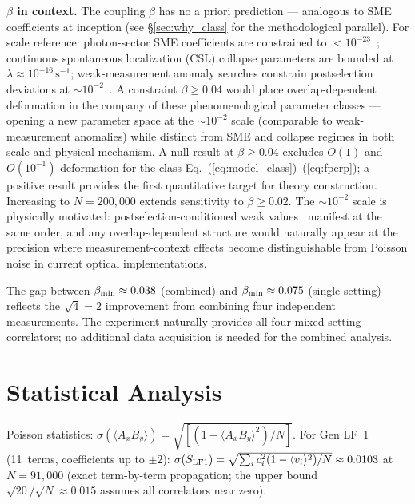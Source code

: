 \documentclass[twocolumn,aps,pra,superscriptaddress,floatfix,10pt]{revtex4-2}
\begin{document}
\textbf{$\beta$ in context.} The coupling $\beta$ has no a priori prediction --- analogous to
SME coefficients at inception (see \S\ref{sec:why_class} for the methodological parallel).
For scale reference: photon-sector SME coefficients are constrained to
${<}10^{-23}$~\cite{Colladay1997}; continuous spontaneous localization (CSL) collapse parameters
are bounded at $\lambda \approx 10^{-16}\,\text{s}^{-1}$; weak-measurement anomaly searches constrain
postselection deviations at $\sim\!10^{-2}$~\cite{Aharonov1988}. A constraint $\beta \ge 0.04$ would place
overlap-dependent deformation in the company of these phenomenological
parameter classes --- opening a new parameter space at the $\sim\!10^{-2}$ scale
(comparable to weak-measurement anomalies) while distinct from SME and
collapse regimes in both scale and physical mechanism. A null result at
$\beta \ge 0.04$ excludes $O(1)$ and $O(10^{-1})$ deformation for the class Eq.~(\ref{eq:model_class})--(\ref{eq:fperp});
a positive result provides the first quantitative target for theory
construction. Increasing to $N = 200{,}000$ extends sensitivity to $\beta \ge 0.02$.
The $\sim\!10^{-2}$ scale is
physically motivated: postselection-conditioned weak values~\cite{Aharonov1988} manifest
at the same order, and any overlap-dependent structure would naturally appear at the precision where
measurement-context effects
become distinguishable from Poisson noise in current optical
implementations.

The gap between $\beta_{\rm min} \approx 0.038$ (combined) and $\beta_{\rm min} \approx 0.075$ (single setting)
reflects the $\sqrt{4} = 2$ improvement from combining four independent measurements.
The experiment naturally provides all four mixed-setting correlators; no
additional data acquisition is needed for the combined analysis.

\section{Statistical Analysis}
\label{sec:statistics}

Poisson statistics: $\sigma(\langle A_x B_y\rangle) = \sqrt{[(1 - \langle A_x B_y\rangle^2) / N]}$. For Gen LF~1
(11~terms, coefficients up to $\pm 2$): $\sigma(S_{\rm LF1}) = \sqrt{\sum_i c_i^2(1 - \langle v_i\rangle^2)/N} \approx 0.0103$
at $N = 91{,}000$ (exact term-by-term propagation; the upper bound $\sqrt{20}/\sqrt{N} \approx 0.015$
assumes all correlators near zero).
\end{document}
